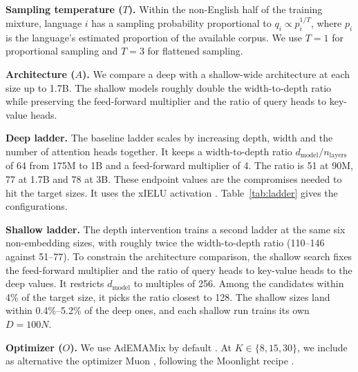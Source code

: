 \textbf{Sampling temperature ($T$).}
Within the non-English half of the training mixture, language $i$ has a sampling probability proportional to
$q_i \propto p_i^{1/T}$,
where $p_i$ is the language's estimated proportion of the available corpus. We use $T=1$ for proportional sampling and $T=3$ for flattened sampling.

\textbf{Architecture ($A$).} We compare a deep with a shallow-wide architecture at each size up to 1.7B. The shallow models roughly double the width-to-depth ratio while preserving the feed-forward multiplier and the ratio of query heads to key-value heads. %

\textbf{Deep ladder.} The baseline ladder scales by increasing depth, width and the number of attention heads together. It keeps a width-to-depth ratio $d_{\mathrm{model}}/n_{\mathrm{layers}}$ of 64 from 175M to 1B and a feed-forward multiplier of 4. The ratio is 51 at 90M, 77 at 1.7B and 78 at 3B. These endpoint values are the compromises needed to hit the target sizes. It uses the xIELU activation \citep{huang_xielu_2025}. Table~\ref{tab:ladder} gives the configurations.

\textbf{Shallow ladder.} The depth intervention trains a second ladder at the same six non-embedding sizes, with roughly twice the width-to-depth ratio (110--146 against 51--77). To constrain the architecture comparison, the shallow search fixes the feed-forward multiplier and the ratio of query heads to key-value heads to the deep values. It restricts $d_{\mathrm{model}}$ to multiples of 256. Among the candidates within 4\% of the target size, it picks the ratio closest to 128. The shallow sizes land within 0.4\%--5.2\% of the deep ones, and each shallow run trains its own $D = 100N$.

\textbf{Optimizer ($O$).}
We use AdEMAMix by default \citep{pagliardini_ademamix_2024}. At $K \in \{8, 15, 30\}$, we include as alternative the optimizer Muon \citep{jordan_muon_2024}, following the Moonlight recipe \citep{liu_muon_2025}. %


